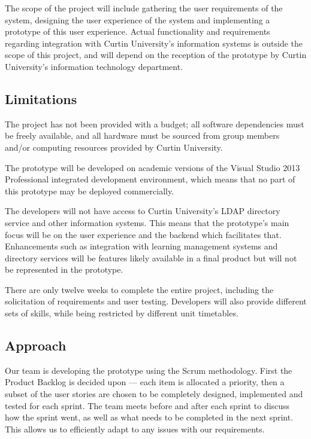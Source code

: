 \documentclass[a4paper,titlepage,12pt]{article}
\begin{document}
The scope of the project will include gathering the user requirements of the
system, designing the user experience of the system and implementing a
prototype of this user experience. Actual functionality and requirements
regarding integration with Curtin University's information systems is outside
the scope of this project, and will depend on the reception of the prototype by
Curtin University's information technology department.

\newpage

\subsection{Limitations}

The project has not been provided with a budget; all software dependencies must
be freely available, and all hardware must be sourced from group members and/or
computing resources provided by Curtin University.

The prototype will be developed on academic versions of the Visual Studio 2013
Professional integrated development environment, which means that no part of
this prototype may be deployed commercially.

The developers will not have access to Curtin University's LDAP directory
service and other information systems. This means that the prototype's main
focus will be on the user experience and the backend which facilitates that.
Enhancements such as integration with learning management systems and directory
services will be features likely available in a final product but will not be
represented in the prototype.

There are only twelve weeks to complete the entire project, including the
solicitation of requirements and user testing. Developers will also provide
different sets of skills, while being restricted by different unit timetables.

\subsection{Approach}

Our team is developing the prototype using the Scrum methodology. First the
Product Backlog is decided upon --- each item is allocated a priority, then
a subset of the user stories are chosen to be completely designed, implemented
and tested for each sprint. The team meets before and after each sprint to
discuss how the sprint went, as well as what needs to be completed in the next
sprint. This allows us to efficiently adapt to any issues with our
requirements.
\end{document}
